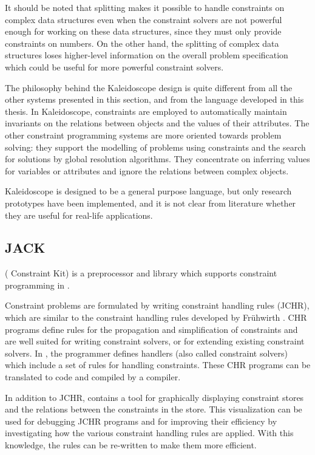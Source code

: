 It should be noted that splitting makes it possible to handle
constraints on complex data structures even when the constraint
solvers are not powerful enough for working on these data structures,
since they must only provide constraints on numbers.  On the other
hand, the splitting of complex data structures loses higher-level
information on the overall problem specification which could be useful
for more powerful constraint solvers.

The philosophy behind the Kaleidoscope design is quite different from
all the other systems presented in this section, and from the
\turtle{} language developed in this thesis.  In Kaleidoscope,
constraints are employed to automatically maintain invariants on the
relations between objects and the values of their attributes.  The
other constraint programming systems are more oriented towards problem
solving: they support the modelling of problems using constraints and
the search for solutions by global resolution algorithms.  They
concentrate on inferring values for variables or attributes and ignore
the relations between complex objects.

Kaleidoscope is designed to be a general purpose language, but only
research prototypes have been implemented, and it is not clear from
literature whether they are useful for real-life applications.

\subsection{JACK}

\jack{} (\java{} Constraint Kit) \cite{abdennadher01:jack:inp,Jack2}
is a preprocessor and library which supports constraint programming in
\java{}.

Constraint problems are formulated by writing \java{} constraint
handling rules (JCHR), which are similar to the constraint handling
rules developed by Fr\"uhwirth \cite{fruehwirth98chr}. CHR programs
define rules for the propagation and simplification of constraints and
are well suited for writing constraint solvers, or for extending
existing constraint solvers.  In \jack{}, the programmer defines
handlers (also called constraint solvers) which include a set of rules
for handling constraints.  These CHR programs can be translated to
\java{} code and compiled by a \java{} compiler.

In addition to JCHR, \jack{} contains a tool for graphically
displaying constraint stores and the relations between the constraints
in the store.  This visualization can be used for debugging JCHR
programs and for improving their efficiency by investigating how the
various constraint handling rules are applied.  With this knowledge,
the rules can be re-written to make them more efficient.


